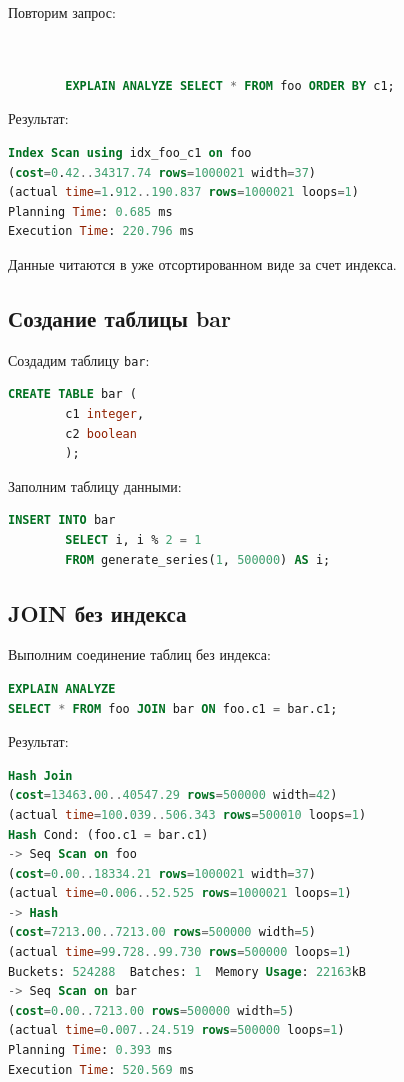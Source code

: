 \documentclass{bmstu-sob}
\begin{document}
	
	Повторим запрос:
	
	\begin{lstlisting}[language=SQL]
		
		
		EXPLAIN ANALYZE SELECT * FROM foo ORDER BY c1;
	\end{lstlisting}
	
	
	Результат:
	
	\begin{lstlisting}[language=SQL]
Index Scan using idx_foo_c1 on foo
(cost=0.42..34317.74 rows=1000021 width=37)
(actual time=1.912..190.837 rows=1000021 loops=1)
Planning Time: 0.685 ms
Execution Time: 220.796 ms
	\end{lstlisting}
	
	
	Данные читаются в уже отсортированном виде за счет индекса.
	
	\subsection{Создание таблицы bar}
	
	Создадим таблицу \texttt{bar}:
	
	\begin{lstlisting}[language=SQL]
	CREATE TABLE bar (
		c1 integer,
		c2 boolean
		);
	\end{lstlisting}
	
	
	Заполним таблицу данными:
	
	\begin{lstlisting}[language=SQL]
	INSERT INTO bar
		SELECT i, i % 2 = 1
		FROM generate_series(1, 500000) AS i;
	\end{lstlisting}
	
	
	\subsection{JOIN без индекса}
	
	Выполним соединение таблиц без индекса:
	
	\begin{lstlisting}[language=SQL]
EXPLAIN ANALYZE
SELECT * FROM foo JOIN bar ON foo.c1 = bar.c1;
	\end{lstlisting}
	
	
	Результат:
	
	\begin{lstlisting}[language=SQL]
Hash Join
(cost=13463.00..40547.29 rows=500000 width=42)
(actual time=100.039..506.343 rows=500010 loops=1)
Hash Cond: (foo.c1 = bar.c1)
-> Seq Scan on foo
(cost=0.00..18334.21 rows=1000021 width=37)
(actual time=0.006..52.525 rows=1000021 loops=1)
-> Hash
(cost=7213.00..7213.00 rows=500000 width=5)
(actual time=99.728..99.730 rows=500000 loops=1)
Buckets: 524288  Batches: 1  Memory Usage: 22163kB
-> Seq Scan on bar
(cost=0.00..7213.00 rows=500000 width=5)
(actual time=0.007..24.519 rows=500000 loops=1)
Planning Time: 0.393 ms
Execution Time: 520.569 ms
	\end{lstlisting}
	
\end{document}
